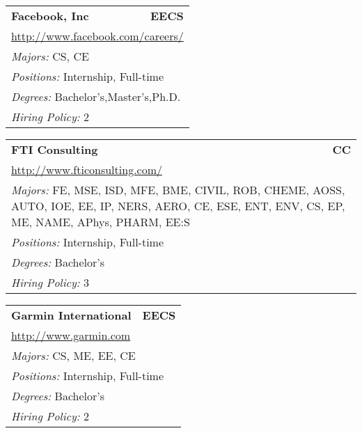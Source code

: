 \documentclass[twoside]{article}
\begin{document}
\begin{center}
\begin{multicols}{3}
\begin{FlushLeft}
\begin{minipage}{\columnwidth}\begin{tabularx}{.95\columnwidth}{Xr}
                 {\Large\bf Facebook, Inc} & {\Large\bf EECS}\\
    \multicolumn{2}{p{.95\columnwidth}}{\url{http://www.facebook.com/careers/}}\\
    \multicolumn{2}{p{.95\columnwidth}}{\emph{Majors:} CS, CE}\\
    \multicolumn{2}{p{.95\columnwidth}}{\emph{Positions:} Internship, Full-time}\\
    \multicolumn{2}{p{.95\columnwidth}}{\emph{Degrees:} Bachelor's,Master's,Ph.D.}\\
    \multicolumn{2}{p{.95\columnwidth}}{\emph{Hiring Policy:} 2}\\
    \end{tabularx}
    
\end{minipage}
 
\begin{minipage}{\columnwidth}\begin{tabularx}{.95\columnwidth}{Xr}
                 {\Large\bf FTI Consulting} & {\Large\bf CC}\\
    \multicolumn{2}{p{.95\columnwidth}}{\url{http://www.fticonsulting.com/}}\\
    \multicolumn{2}{p{.95\columnwidth}}{\emph{Majors:} FE, MSE, ISD, MFE, BME, CIVIL, ROB, CHEME, AOSS, AUTO, IOE, EE, IP, NERS, AERO, CE, ESE, ENT, ENV, CS, EP, ME, NAME, APhys, PHARM, EE:S}\\
    \multicolumn{2}{p{.95\columnwidth}}{\emph{Positions:} Internship, Full-time}\\
    \multicolumn{2}{p{.95\columnwidth}}{\emph{Degrees:} Bachelor's}\\
    \multicolumn{2}{p{.95\columnwidth}}{\emph{Hiring Policy:} 3}\\
    \end{tabularx}
    
\end{minipage}
 
\begin{minipage}{\columnwidth}\begin{tabularx}{.95\columnwidth}{Xr}
                 {\Large\bf Garmin International} & {\Large\bf EECS}\\
    \multicolumn{2}{p{.95\columnwidth}}{\url{http://www.garmin.com}}\\
    \multicolumn{2}{p{.95\columnwidth}}{\emph{Majors:} CS, ME, EE, CE}\\
    \multicolumn{2}{p{.95\columnwidth}}{\emph{Positions:} Internship, Full-time}\\
    \multicolumn{2}{p{.95\columnwidth}}{\emph{Degrees:} Bachelor's}\\
    \multicolumn{2}{p{.95\columnwidth}}{\emph{Hiring Policy:} 2}\\
    \end{tabularx}
    

\end{minipage}
\end{FlushLeft}
\end{multicols}
\end{center}
\end{document}
